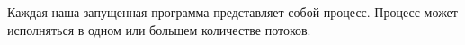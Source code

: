 Каждая наша запущенная программа представляет собой процесс. Процесс может исполняться в одном или большем количестве потоков.